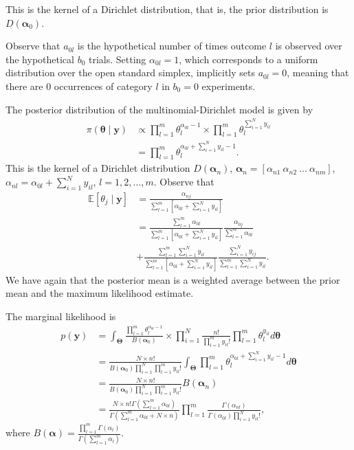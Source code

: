 \begin{enumerate}
This is the kernel of a Dirichlet distribution, that is, the prior distribution is $D(\bm{\alpha}_0)$.

Observe that \( a_{0l} \) is the hypothetical number of times outcome \( l \) is observed over the hypothetical \( b_0 \) trials. Setting \( \alpha_{0l} = 1 \), which corresponds to a uniform distribution over the open standard simplex, implicitly sets \( a_{0l} = 0 \), meaning that there are 0 occurrences of category \( l \) in \( b_0 = 0 \) experiments.  

The posterior distribution of the multinomial-Dirichlet model is given by
\begin{align}
	\pi(\bm{\theta}\mid \bm{y})&\propto \prod_{l=1}^m \theta_l^{\alpha_{0l}-1}\times\prod_{l=1}^m \theta_l^{\sum_{i=1}^{N} y_{il}}\nonumber\\
	&=\prod_{l=1}^m \theta_l^{\alpha_{0l}+\sum_{i=1}^{N} y_{il}-1}\nonumber.
\end{align}
This is the kernel of a Dirichlet distribution $D(\bm{\alpha}_n)$, $\bm{\alpha}_n=\left[\alpha_{n1} \ \alpha_{n2} \ \dots \ \alpha_{nm}\right]$, $\alpha_{nl}=\alpha_{0l}+\sum_{i=1}^{N}y_{il}$, $l=1,2,\dots,m$. Observe that
\begin{align}
	\mathbb{E}[\theta_{j}\mid \bm{y}]&=\frac{\alpha_{nj}}{\sum_{l=1}^m \left[\alpha_{0l}+\sum_{i=1}^N y_{il}\right]}\nonumber\\
	&=\frac{\sum_{l=1}^m \alpha_{0l}}{\sum_{l=1}^m \left[\alpha_{0l}+\sum_{i=1}^N y_{il}\right]}\frac{\alpha_{0j}}{\sum_{l=1}^m \alpha_{0l}}\nonumber\\
	&+\frac{\sum_{l=1}^m\sum_{i=1}^N y_{il}}{\sum_{l=1}^m \left[\alpha_{0l}+\sum_{i=1}^N y_{il}\right]}\frac{\sum_{i=1}^N y_{ij}}{\sum_{l=1}^m\sum_{i=1}^N y_{il}}.\nonumber
\end{align}
We have again that the posterior mean is a weighted average between the prior mean and the maximum likelihood estimate.

The marginal likelihood is
\begin{align}
	p(\bm{y})&=\int_{\bm{\Theta}}\frac{\prod_{l=1}^m \theta_l^{\alpha_{0l}-1}}{B(\bm{\alpha}_0)}\times \prod_{i=1}^N\frac{n!}{\prod_{l=1}^m y_{il}!}\prod_{l=1}^m \theta_{l}^{y_{il}}d\bm{\theta}\nonumber\\
	&=\frac{N\times n!}{B(\bm{\alpha}_0)\prod_{i=1}^N\prod_{l=1}^m y_{il}!}\int_{\bm{\Theta}} \prod_{l=1}^m \theta_l^{\alpha_{0l}+\sum_{i=1}^N y_{il}-1} d\bm{\theta}\nonumber\\
	&=\frac{N\times n!}{B(\bm{\alpha}_0)\prod_{i=1}^N\prod_{l=1}^m y_{il}!}B(\bm{\alpha}_n)\nonumber\\
	&=\frac{N\times n! \Gamma\left(\sum_{l=1}^m\nonumber \alpha_{0l}\right)}{\Gamma\left(\sum_{l=1}^m \alpha_{0l}+N\times n\right)}\prod_{l=1}^m \frac{\Gamma\left( \alpha_{nl}\right)}{\Gamma\left(\alpha_{0l}\right)\prod_{i=1}^N y_{il}!},\nonumber
\end{align}
where $B(\bm{\alpha})=\frac{\prod_{l=1}^m\Gamma(\alpha_l)}{\Gamma\left(\sum_{l=1}^m \alpha_l\right)}$.


\end{enumerate}
